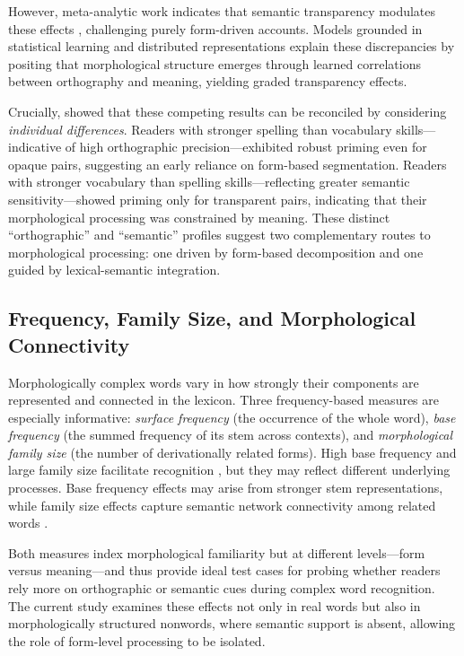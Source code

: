\documentclass[preprint,12pt, authoryear, review]{elsarticle}
\begin{document}
However, meta-analytic work indicates that semantic transparency modulates these effects \citep{feldmanEarlyMorphologicalProcessing2009}, challenging purely form-driven accounts. Models grounded in statistical learning and distributed representations \citep{plautAreNonsemanticMorphological2000, baayenAmorphousModelMorphological2011} explain these discrepancies by positing that morphological structure emerges through learned correlations between orthography and meaning, yielding graded transparency effects. 

Crucially, \citet{andrewsMorphologicalPrimingStronger2013} showed that these competing results can be reconciled by considering \textit{individual differences}. Readers with stronger spelling than vocabulary skills—indicative of high orthographic precision—exhibited robust priming even for opaque pairs, suggesting an early reliance on form-based segmentation. Readers with stronger vocabulary than spelling skills—reflecting greater semantic sensitivity—showed priming only for transparent pairs, indicating that their morphological processing was constrained by meaning. These distinct “orthographic” and “semantic” profiles suggest two complementary routes to morphological processing: one driven by form-based decomposition and one guided by lexical-semantic integration.

\subsection{Frequency, Family Size, and Morphological Connectivity}

Morphologically complex words vary in how strongly their components are represented and connected in the lexicon. Three frequency-based measures are especially informative: \textit{surface frequency} (the occurrence of the whole word), \textit{base frequency} (the summed frequency of its stem across contexts), and \textit{morphological family size} (the number of derivationally related forms). High base frequency and large family size facilitate recognition \citep{taftRecognitionAffixedWords1979, schreuderMorphologicalFamilySize1997}, but they may reflect different underlying processes. Base frequency effects may arise from stronger stem representations, while family size effects capture semantic network connectivity among related words \citep{vannestCoActivationMorphologicalFamilies2011}. 

Both measures index morphological familiarity but at different levels—form versus meaning—and thus provide ideal test cases for probing whether readers rely more on orthographic or semantic cues during complex word recognition. The current study examines these effects not only in real words but also in morphologically structured nonwords, where semantic support is absent, allowing the role of form-level processing to be isolated.
\end{document}
